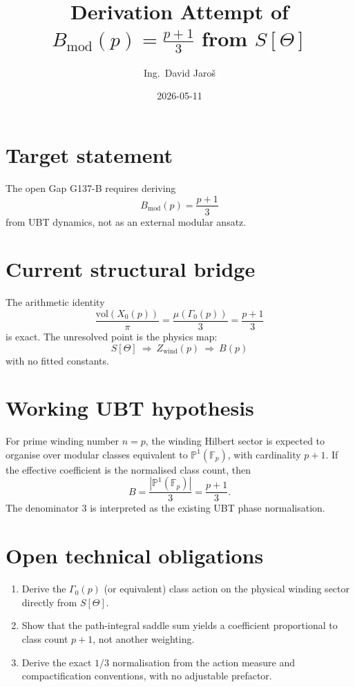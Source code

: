 \documentclass[12pt,a4paper]{article}
\title{\textbf{Derivation Attempt of \(B_{\mathrm{mod}}(p)=\frac{p+1}{3}\) from \(S[\Theta]\)}}
\author{Ing.\ David Jaro\v{s}}
\date{2026-05-11}
\begin{document}
  \maketitle
\fi

\section{Target statement}

The open Gap G137-B requires deriving
\begin{equation}
  B_{\mathrm{mod}}(p) = \frac{p+1}{3}
\end{equation}
from UBT dynamics, not as an external modular ansatz.

\section{Current structural bridge}

The arithmetic identity
\begin{equation}
  \frac{\mathrm{vol}(X_0(p))}{\pi}=\frac{\mu(\Gamma_0(p))}{3}=\frac{p+1}{3}
\end{equation}
is exact. The unresolved point is the physics map:
\[
S[\Theta]\ \Longrightarrow\ Z_{\mathrm{wind}}(p)\ \Longrightarrow\ B(p)
\]
with no fitted constants.

\section{Working UBT hypothesis}

For prime winding number \(n=p\), the winding Hilbert sector is expected to
organise over modular classes equivalent to \(\mathbb{P}^1(\mathbb{F}_p)\),
with cardinality \(p+1\). If the effective coefficient is the normalised class
count, then
\begin{equation}
  B = \frac{|\mathbb{P}^1(\mathbb{F}_p)|}{3} = \frac{p+1}{3}.
\end{equation}
The denominator 3 is interpreted as the existing UBT phase normalisation.

\section{Open technical obligations}

\begin{enumerate}
  \item Derive the \(\Gamma_0(p)\) (or equivalent) class action on the physical
    winding sector directly from \(S[\Theta]\).
  \item Show that the path-integral saddle sum yields a coefficient proportional
    to class count \(p+1\), not another weighting.
  \item Derive the exact \(1/3\) normalisation from the action measure and
    compactification conventions, with no adjustable prefactor.
\end{enumerate}
\end{document}
